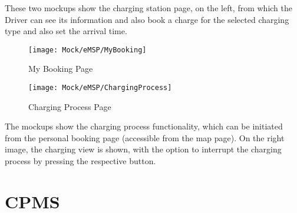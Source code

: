These two mockups show the charging station page, on the left, from which the Driver can see its information and also book a charge for the selected charging type and also set the arrival time.
\begin{figure}[H]
    \begin{minipage}[t]{.45\textwidth} %
    \texttt{[image: Mock/eMSP/MyBooking]}
    \caption{My Booking Page}
    \label{fig:MyBooking}
\end{minipage}
\hfill
\begin{minipage}[t]{.45\textwidth}
    \texttt{[image: Mock/eMSP/ChargingProcess]}
    \caption{Charging Process Page}
    \label{fig:ChargingProcess}
\end{minipage}
\end{figure}
The mockups show the charging process functionality, which can be initiated from the personal booking page (accessible from the map page). On the right image, the charging view is shown, with the option to interrupt the charging process by pressing the respective button. 
\section{CPMS}


